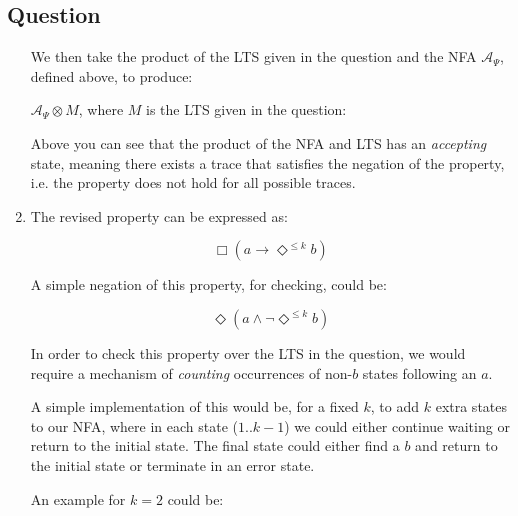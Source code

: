 \documentclass[12pt,a4paper]{article}
\newcounter{question}\setcounter{question}{1}
\newenvironment{question}{%
\subsection*{Question \arabic{question}}}%
{\stepcounter{question}}
\begin{document}
\begin{question}
\begin{enumerate}[label= (\alph*)]
          We then take the product of the LTS given in the question and the NFA $\mathcal{A}_{\Psi}$, defined above, to produce:

          $\mathcal{A}_{\Psi} \otimes M$, where $M$ is the LTS given in the question:


          \begin{center}
          \end{center}

          Above you can see that the product of the NFA and LTS has an \textit{accepting} state, meaning there exists a trace that satisfies the negation of the property, i.e. the property does not hold for all possible traces.

    \item
          The revised property can be expressed as:

          \[
            \Box (a \rightarrow \Diamond^{\leq k} b)
          \]

          A simple negation of this property, for checking, could be:

          \[
          \Diamond (a \wedge \neg \Diamond^{\leq k}b)
          \]


          In order to check this property over the LTS in the question, we would require a mechanism of \textit{counting} occurrences of non-$b$ states following an $a$.

          A simple implementation of this would be, for a fixed $k$, to add $k$ extra states to our NFA, where in each state ($1..k-1$) we could either continue waiting or return to the initial state. The final state could either find a $b$ and return to the initial state or terminate in an error state.

          An example for $k=2$ could be:


          \begin{center}
\end{center}
\end{enumerate}
\end{question}
\end{document}
